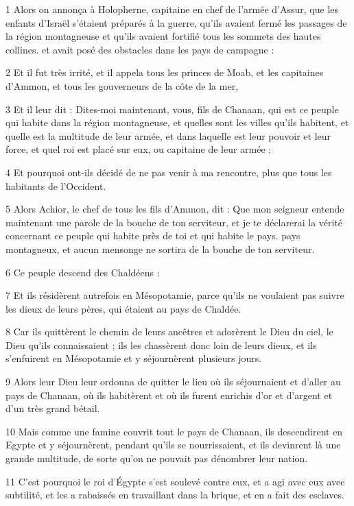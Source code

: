 \par 1 Alors on annonça à Holopherne, capitaine en chef de l'armée d'Assur, que les enfants d'Israël s'étaient préparés à la guerre, qu'ils avaient fermé les passages de la région montagneuse et qu'ils avaient fortifié tous les sommets des hautes collines. et avait posé des obstacles dans les pays de campagne :
\par 2 Et il fut très irrité, et il appela tous les princes de Moab, et les capitaines d'Ammon, et tous les gouverneurs de la côte de la mer,
\par 3 Et il leur dit : Dites-moi maintenant, vous, fils de Chanaan, qui est ce peuple qui habite dans la région montagneuse, et quelles sont les villes qu'ils habitent, et quelle est la multitude de leur armée, et dans laquelle est leur pouvoir et leur force, et quel roi est placé sur eux, ou capitaine de leur armée ;
\par 4 Et pourquoi ont-ils décidé de ne pas venir à ma rencontre, plus que tous les habitants de l'Occident.
\par 5 Alors Achior, le chef de tous les fils d'Ammon, dit : Que mon seigneur entende maintenant une parole de la bouche de ton serviteur, et je te déclarerai la vérité concernant ce peuple qui habite près de toi et qui habite le pays. pays montagneux, et aucun mensonge ne sortira de la bouche de ton serviteur.
\par 6 Ce peuple descend des Chaldéens :
\par 7 Et ils résidèrent autrefois en Mésopotamie, parce qu'ils ne voulaient pas suivre les dieux de leurs pères, qui étaient au pays de Chaldée.
\par 8 Car ils quittèrent le chemin de leurs ancêtres et adorèrent le Dieu du ciel, le Dieu qu'ils connaissaient ; ils les chassèrent donc loin de leurs dieux, et ils s'enfuirent en Mésopotamie et y séjournèrent plusieurs jours.
\par 9 Alors leur Dieu leur ordonna de quitter le lieu où ils séjournaient et d'aller au pays de Chanaan, où ils habitèrent et où ils furent enrichis d'or et d'argent et d'un très grand bétail.
\par 10 Mais comme une famine couvrit tout le pays de Chanaan, ils descendirent en Egypte et y séjournèrent, pendant qu'ils se nourrissaient, et ils devinrent là une grande multitude, de sorte qu'on ne pouvait pas dénombrer leur nation.
\par 11 C'est pourquoi le roi d'Égypte s'est soulevé contre eux, et a agi avec eux avec subtilité, et les a rabaissés en travaillant dans la brique, et en a fait des esclaves.
